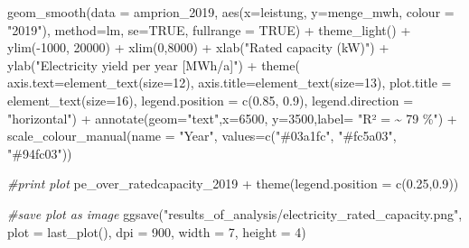 \documentclass[a4paper,11pt]{article}
\newenvironment{Shaded}{\begin{snugshade}}{\end{snugshade}}
\newcommand{\AttributeTok}[1]{\textcolor[rgb]{0.77,0.63,0.00}{#1}}
\newcommand{\CommentTok}[1]{\textcolor[rgb]{0.56,0.35,0.01}{\textit{#1}}}
\newcommand{\ConstantTok}[1]{\textcolor[rgb]{0.00,0.00,0.00}{#1}}
\newcommand{\DecValTok}[1]{\textcolor[rgb]{0.00,0.00,0.81}{#1}}
\newcommand{\FloatTok}[1]{\textcolor[rgb]{0.00,0.00,0.81}{#1}}
\newcommand{\FunctionTok}[1]{\textcolor[rgb]{0.00,0.00,0.00}{#1}}
\newcommand{\NormalTok}[1]{#1}
\newcommand{\SpecialCharTok}[1]{\textcolor[rgb]{0.00,0.00,0.00}{#1}}
\newcommand{\StringTok}[1]{\textcolor[rgb]{0.31,0.60,0.02}{#1}}
\begin{document}
\begin{Shaded}
\begin{Highlighting}[]
  \FunctionTok{geom\_smooth}\NormalTok{(}\AttributeTok{data =}\NormalTok{ amprion\_2019, }
              \FunctionTok{aes}\NormalTok{(}\AttributeTok{x=}\NormalTok{leistung, }\AttributeTok{y=}\NormalTok{menge\_mwh, }\AttributeTok{colour =} \StringTok{"2019"}\NormalTok{), }
              \AttributeTok{method=}\NormalTok{lm, }\AttributeTok{se=}\ConstantTok{TRUE}\NormalTok{, }\AttributeTok{fullrange =} \ConstantTok{TRUE}\NormalTok{)  }\SpecialCharTok{+}
  \FunctionTok{theme\_light}\NormalTok{() }\SpecialCharTok{+}
  \FunctionTok{ylim}\NormalTok{(}\SpecialCharTok{{-}}\DecValTok{1000}\NormalTok{, }\DecValTok{20000}\NormalTok{) }\SpecialCharTok{+}
  \FunctionTok{xlim}\NormalTok{(}\DecValTok{0}\NormalTok{,}\DecValTok{8000}\NormalTok{) }\SpecialCharTok{+}
  \FunctionTok{xlab}\NormalTok{(}\StringTok{"Rated capacity (kW)"}\NormalTok{) }\SpecialCharTok{+}
  \FunctionTok{ylab}\NormalTok{(}\StringTok{"Electricity yield per year [MWh/a]"}\NormalTok{) }\SpecialCharTok{+}
  \FunctionTok{theme}\NormalTok{( }\AttributeTok{axis.text=}\FunctionTok{element\_text}\NormalTok{(}\AttributeTok{size=}\DecValTok{12}\NormalTok{),}
         \AttributeTok{axis.title=}\FunctionTok{element\_text}\NormalTok{(}\AttributeTok{size=}\DecValTok{13}\NormalTok{),}
         \AttributeTok{plot.title =} \FunctionTok{element\_text}\NormalTok{(}\AttributeTok{size=}\DecValTok{16}\NormalTok{),}
         \AttributeTok{legend.position =} \FunctionTok{c}\NormalTok{(}\FloatTok{0.85}\NormalTok{, }\FloatTok{0.9}\NormalTok{),}
         \AttributeTok{legend.direction =} \StringTok{"horizontal"}\NormalTok{) }\SpecialCharTok{+}
  \FunctionTok{annotate}\NormalTok{(}\AttributeTok{geom=}\StringTok{"text"}\NormalTok{,}\AttributeTok{x=}\DecValTok{6500}\NormalTok{,}
           \AttributeTok{y=}\DecValTok{3500}\NormalTok{,}\AttributeTok{label=} \StringTok{"R² = \textasciitilde{} 79 \%"}\NormalTok{) }\SpecialCharTok{+}
  \FunctionTok{scale\_colour\_manual}\NormalTok{(}\AttributeTok{name =} \StringTok{"Year"}\NormalTok{, }\AttributeTok{values=}\FunctionTok{c}\NormalTok{(}\StringTok{"\#03a1fc"}\NormalTok{, }\StringTok{"\#fc5a03"}\NormalTok{, }\StringTok{"\#94fc03"}\NormalTok{)) }

\CommentTok{\#print plot}
\NormalTok{pe\_over\_ratedcapacity\_2019 }\SpecialCharTok{+}  \FunctionTok{theme}\NormalTok{(}\AttributeTok{legend.position =} \FunctionTok{c}\NormalTok{(}\FloatTok{0.25}\NormalTok{,}\FloatTok{0.9}\NormalTok{))}

\CommentTok{\#save plot as image}
\FunctionTok{ggsave}\NormalTok{(}\StringTok{"results\_of\_analysis/electricity\_rated\_capacity.png"}\NormalTok{,}
       \AttributeTok{plot =} \FunctionTok{last\_plot}\NormalTok{(),}
       \AttributeTok{dpi =} \DecValTok{900}\NormalTok{,}
       \AttributeTok{width =} \DecValTok{7}\NormalTok{,}
       \AttributeTok{height =} \DecValTok{4}\NormalTok{)}


\end{Highlighting}
\end{Shaded}
\end{document}
